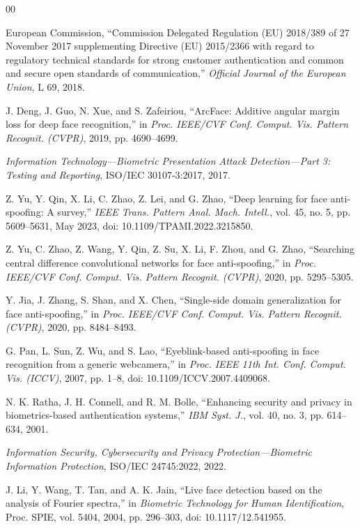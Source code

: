 \documentclass{ieeeaccess}
\begin{document}
\begin{thebibliography}{00}

 European Commission, ``Commission Delegated Regulation (EU) 2018/389 of 27 November
2017 supplementing Directive (EU) 2015/2366 with regard to regulatory technical standards for strong
customer authentication and common and secure open standards of communication,'' \emph{Official Journal
of the European Union}, L 69, 2018.

 J. Deng, J. Guo, N. Xue, and S. Zafeiriou, ``ArcFace: Additive angular margin loss
for deep face recognition,'' in \emph{Proc. IEEE/CVF Conf. Comput. Vis. Pattern Recognit. (CVPR)},
2019, pp. 4690--4699.

 \emph{Information Technology---Biometric Presentation Attack Detection---Part 3:
Testing and Reporting}, ISO/IEC 30107-3:2017, 2017.

 Z. Yu, Y. Qin, X. Li, C. Zhao, Z. Lei, and G. Zhao, ``Deep learning for face
anti-spoofing: A survey,'' \emph{IEEE Trans. Pattern Anal. Mach. Intell.}, vol. 45, no. 5,
pp. 5609--5631, May 2023, doi: 10.1109/TPAMI.2022.3215850.

 Z. Yu, C. Zhao, Z. Wang, Y. Qin, Z. Su, X. Li, F. Zhou, and G. Zhao, ``Searching central
difference convolutional networks for face anti-spoofing,'' in \emph{Proc. IEEE/CVF Conf. Comput. Vis.
Pattern Recognit. (CVPR)}, 2020, pp. 5295--5305.

 Y. Jia, J. Zhang, S. Shan, and X. Chen, ``Single-side domain generalization for face
anti-spoofing,'' in \emph{Proc. IEEE/CVF Conf. Comput. Vis. Pattern Recognit. (CVPR)}, 2020,
pp. 8484--8493.

 G. Pan, L. Sun, Z. Wu, and S. Lao, ``Eyeblink-based anti-spoofing in face
recognition from a generic webcamera,'' in \emph{Proc. IEEE 11th Int. Conf. Comput. Vis. (ICCV)}, 2007,
pp. 1--8, doi: 10.1109/ICCV.2007.4409068.

 N. K. Ratha, J. H. Connell, and R. M. Bolle, ``Enhancing security and privacy in
biometrics-based authentication systems,'' \emph{IBM Syst. J.}, vol. 40, no. 3, pp. 614--634, 2001.

 \emph{Information Security, Cybersecurity and Privacy Protection---Biometric
Information Protection}, ISO/IEC 24745:2022, 2022.

 J. Li, Y. Wang, T. Tan, and A. K. Jain, ``Live face detection based on the analysis of
Fourier spectra,'' in \emph{Biometric Technology for Human Identification}, Proc. SPIE, vol. 5404,
2004, pp. 296--303, doi: 10.1117/12.541955.


\end{thebibliography}
\end{document}
